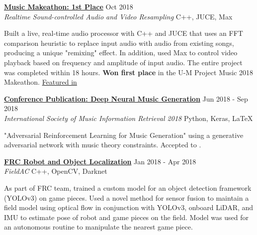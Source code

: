 \documentclass[11pt]{extarticle}
\begin{document}
\noindent
\href{https://github.com/nacgarg/music-makeathon}{\textbf{Music Makeathon: 1st Place}} \hfill Oct 2018\\
\textit{Realtime Sound-controlled Audio and Video Resampling} \hfill C++, JUCE, Max \\
\vspace{-25pt}
\begin{paragraph}{}
	 Built a live, real-time audio processor with C++ and JUCE that uses an FFT comparison heuristic to replace input audio with audio from existing songs, producing a unique "remixing" effect. In addition, used Max to control video playback based on frequency and amplitude of input audio. The entire project was completed within 18 hours. \textbf{Won first place} in the U-M Project Music 2018 Makeathon.
	 \href{https://news.engin.umich.edu/2018/12/hacking-the-perfect-melody/}{Featured in \color{blue}{U-M Engineering Newsletter.}} \\
\end{paragraph}


\noindent
\href{http://ismir2018.ircam.fr/pages/events-lbd.html}{\textbf{Conference Publication: Deep Neural Music Generation}} \hfill Jun 2018 - Sep 2018\\
\textit{International Society of Music Information Retrieval 2018} \hfill Python, Keras, \LaTeX\\
\vspace{-25pt}
\begin{paragraph}{}
\begin{sloppypar}
"Adversarial Reinforcement Learning for Music Generation" using a generative adversarial network with music theory constraints. Accepted to \href{http://ismir2018.ircam.fr/pages/events-lbd.html}{\color{blue}{ISMIR 2018, Late Breaking Session}}.\\
\end{sloppypar}
\end{paragraph}

\noindent
\href{https://github.com/RoboticsTeam4904/FieldAC}{\textbf{FRC Robot and Object Localization}} \hfill Jan 2018 - Apr 2018\\
\textit{FieldAC} \hfill C++, OpenCV, Darknet\\
\vspace{-25pt}
\begin{paragraph}{}
As part of FRC team, trained a custom model for an object detection framework (YOLOv3) on game pieces. Used a novel method for sensor fusion to maintain a field model using optical flow in conjunction with YOLOv3, onboard LiDAR, and IMU to estimate pose of robot and game pieces on the field. Model was used for an autonomous routine to manipulate the nearest game piece.\\
\end{paragraph}
\end{document}
